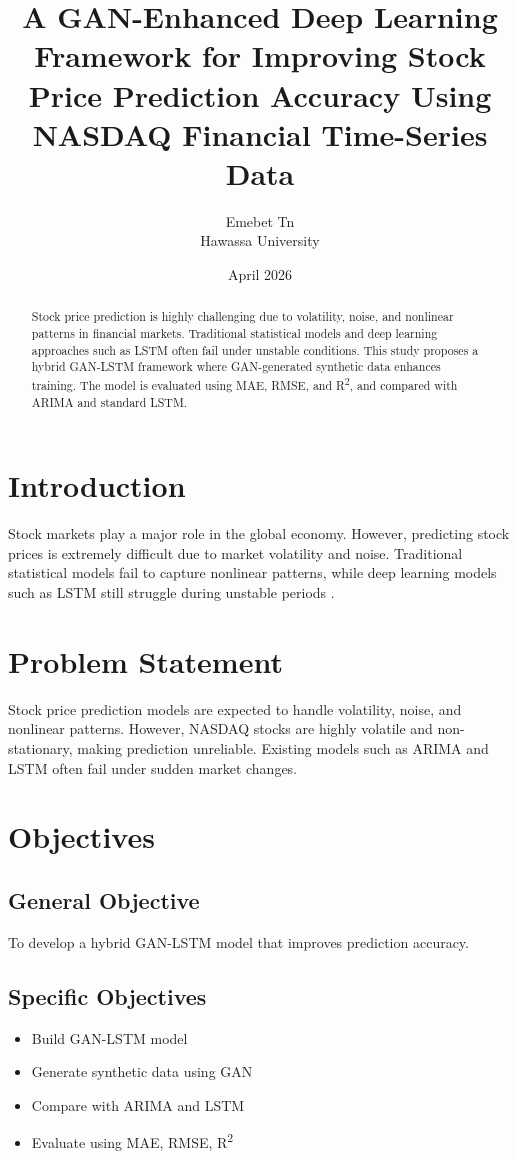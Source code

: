 \documentclass[12pt]{article}
\title{A GAN-Enhanced Deep Learning Framework for Improving Stock Price Prediction Accuracy Using NASDAQ Financial Time-Series Data}
\author{Emebet Tn \\ Hawassa University}
\date{April 2026}
\begin{document}
\maketitle

\begin{abstract}
Stock price prediction is highly challenging due to volatility, noise, and nonlinear patterns in financial markets. Traditional statistical models and deep learning approaches such as LSTM often fail under unstable conditions. This study proposes a hybrid GAN-LSTM framework where GAN-generated synthetic data enhances training. The model is evaluated using MAE, RMSE, and R\textsuperscript{2}, and compared with ARIMA and standard LSTM.
\end{abstract}

\section{Introduction}
Stock markets play a major role in the global economy. However, predicting stock prices is extremely difficult due to market volatility and noise. Traditional statistical models fail to capture nonlinear patterns, while deep learning models such as LSTM still struggle during unstable periods \cite{hu2021}.

\section{Problem Statement}
Stock price prediction models are expected to handle volatility, noise, and nonlinear patterns. However, NASDAQ stocks are highly volatile and non-stationary, making prediction unreliable. Existing models such as ARIMA and LSTM often fail under sudden market changes.

\section{Objectives}
\subsection{General Objective}
To develop a hybrid GAN-LSTM model that improves prediction accuracy.

\subsection{Specific Objectives}
\begin{itemize}
\item Build GAN-LSTM model
\item Generate synthetic data using GAN
\item Compare with ARIMA and LSTM
\item Evaluate using MAE, RMSE, R\textsuperscript{2}
\end{itemize}
\end{document}
